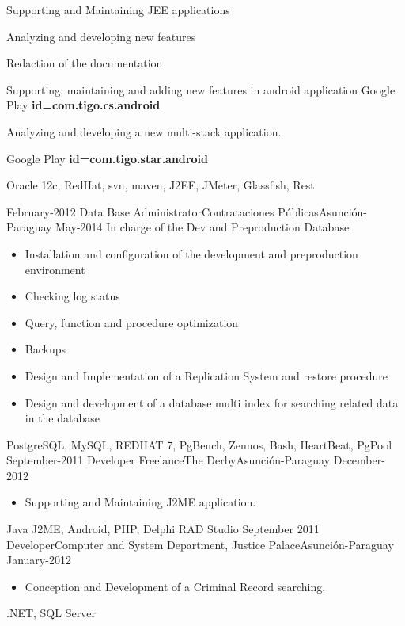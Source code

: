 \begin{experiences}
{                        \begin{itemize}
                            \item Supporting and Maintaining JEE applications
                            \item Analyzing and developing new features
                            \item Redaction of the documentation
                            \item Supporting, maintaining and adding new features in android application \tiny{Google Play \textbf{id=com.tigo.cs.android}}
                            \normalsize{\item Analyzing and developing a new multi-stack application.} \tiny{Google Play \textbf{id=com.tigo.star.android}}
                      \end{itemize}

                }
                {Oracle 12c, RedHat, svn, maven, J2EE, JMeter, Glassfish, Rest}
  \emptySeparator

  \projectexperiences
    {February-2012}   {Data Base Administrator}{Contrataciones Públicas}{Asunción-Paraguay}
    {May-2014} {In charge of the Dev and Preproduction Database}
    {
                      \begin{itemize}
                        \item Installation and configuration of the development  and preproduction environment
                        \item Checking log status
                        \item Query, function and procedure optimization
                        \item Backups
                        \item Design and Implementation of a Replication System and restore procedure
                        \item Design and development of a database multi index for searching related data in the database
                      \end{itemize}
				}
                {PostgreSQL, MySQL, REDHAT 7, PgBench, Zennos, Bash, HeartBeat, PgPool}
  \emptySeparator
  \experience
    {September-2011}   {Developer Freelance}{The Derby}{Asunción-Paraguay}
    {December-2012} {
                      \begin{itemize}
                        \item Supporting and Maintaining J2ME application.
                      \end{itemize}
				}
                {Java J2ME, Android, PHP, Delphi RAD Studio}
  \emptySeparator
  \experience
    {September 2011}   {Developer}{Computer and System Department, Justice Palace}{Asunción-Paraguay}
    {January-2012} {
                      \begin{itemize}
                        \item Conception and Development of a Criminal Record searching.
                      \end{itemize}
				}
                {.NET, SQL Server}
  \emptySeparator
\end{experiences}
